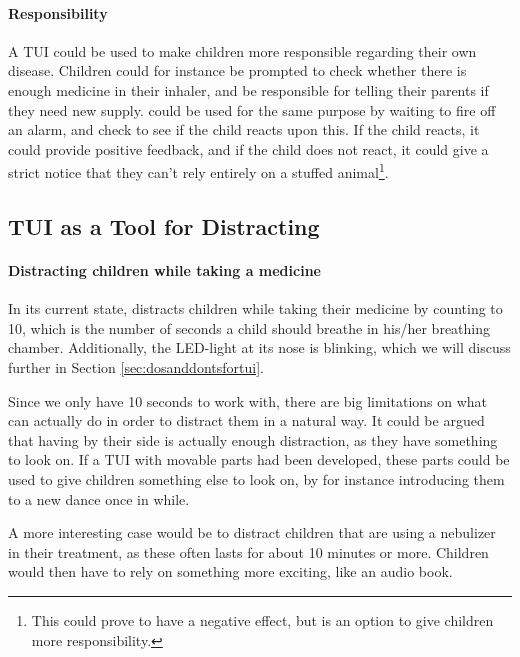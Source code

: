 \paragraph{Responsibility}
A TUI could be used to make children more responsible regarding their own disease. Children could for instance be prompted to check whether there is enough medicine in their inhaler, and be responsible for telling their parents if they need new supply. \ab{} could be used for the same purpose by waiting to fire off an alarm, and check to see if the child reacts upon this. If the child reacts, it could provide positive feedback, and if the child does not react, it could give a strict notice that they can't rely entirely on a stuffed animal\footnote{This could prove to have a negative effect, but is an option to give children more responsibility.}.  

\subsection{TUI as a Tool for Distracting}
\label{sec:tuiasatoolfordistracting}

\paragraph{Distracting children while taking a medicine}
In its current state, \ab{} distracts children while taking their medicine by counting to 10, which is the number of seconds a child should breathe in his/her breathing chamber. Additionally, the LED-light at its nose is blinking, which we will discuss further in Section \ref{sec:dosanddontsfortui}. 

Since we only have 10 seconds to work with, there are big limitations on what \ab{} can actually do in order to distract them in a natural way. It could be argued that having \ab{} by their side is actually enough distraction, as they have something to look on. If a TUI with movable parts had been developed, these parts could be used to give children something else to look on, by for instance introducing them to a new dance once in while.        

A more interesting case would be to distract children that are using a nebulizer in their treatment, as these often lasts for about 10 minutes or more. Children would then have to rely on something more exciting, like an audio book. 

